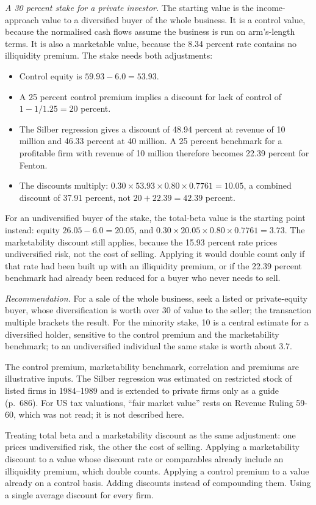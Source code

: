 \begin{qfmethod}
\emph{A 30 percent stake for a private investor.} The starting value is the income-approach value to a diversified buyer of the whole business. It is a control value, because the normalised cash flows assume the business is run on arm's-length terms. It is also a marketable value, because the 8.34 percent rate contains no illiquidity premium. The stake needs both adjustments:
\begin{itemize}
\item Control equity is $59.93-6.0=53.93$.
\item A 25 percent control premium implies a discount for lack of control of $1-1/1.25=20$ percent.
\item The Silber regression gives a discount of 48.94 percent at revenue of 10 million and 46.33 percent at 40 million. A 25 percent benchmark for a profitable firm with revenue of 10 million therefore becomes 22.39 percent for Fenton.
\item The discounts multiply: $0.30\times53.93\times0.80\times0.7761=10.05$, a combined discount of 37.91 percent, not $20+22.39=42.39$ percent.
\end{itemize}
For an undiversified buyer of the stake, the total-beta value is the starting point instead: equity $26.05-6.0=20.05$, and $0.30\times20.05\times0.80\times0.7761=3.73$. The marketability discount still applies, because the 15.93 percent rate prices undiversified risk, not the cost of selling. Applying it would double count only if that rate had been built up with an illiquidity premium, or if the 22.39 percent benchmark had already been reduced for a buyer who never needs to sell.

\emph{Recommendation.} For a sale of the whole business, seek a listed or private-equity buyer, whose diversification is worth over 30 of value to the seller; the transaction multiple brackets the result. For the minority stake, 10 is a central estimate for a diversified holder, sensitive to the control premium and the marketability benchmark; to an undiversified individual the same stake is worth about 3.7.

 The control premium, marketability benchmark, correlation and premiums are illustrative inputs. The Silber regression was estimated on restricted stock of listed firms in 1984--1989 and is extended to private firms only as a guide (p.~686). For US tax valuations, ``fair market value'' rests on Revenue Ruling 59-60, which was not read; it is not described here.

 Treating total beta and a marketability discount as the same adjustment: one prices undiversified risk, the other the cost of selling. Applying a marketability discount to a value whose discount rate or comparables already include an illiquidity premium, which double counts. Applying a control premium to a value already on a control basis. Adding discounts instead of compounding them. Using a single average discount for every firm.


\end{qfmethod}
